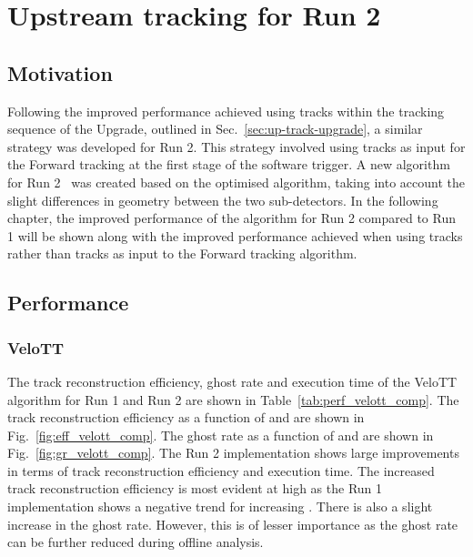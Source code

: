\section{Upstream tracking for \lhcb Run 2}
\label{sec:up-track-run2}

\subsection{Motivation}

Following the improved performance achieved using \velout tracks within the tracking sequence of the \lhcb Upgrade, outlined in Sec.~\ref{sec:up-track-upgrade}, a similar strategy was developed for \lhcb Run 2. This strategy involved using \velott tracks as input for the Forward tracking at the first stage of the software trigger. A new \velott algorithm for Run 2~\cite{velott} was created based on the optimised \velout algorithm, taking into account the slight differences in geometry between the two sub-detectors. In the following chapter, the improved performance of the \velott algorithm for Run 2 compared to Run 1 will be shown along with the improved performance achieved when using \velott tracks rather than \velo tracks as input to the Forward tracking algorithm.

\subsection{Performance}

\subsubsection{VeloTT}

The track reconstruction efficiency, ghost rate and execution time of the VeloTT algorithm for Run 1 and Run 2 are shown in Table~\ref{tab:perf_velott_comp}. The track reconstruction efficiency as a function of \ptot and \pt are shown in Fig.~\ref{fig:eff_velott_comp}. The ghost rate as a function of \ptot and \pt are shown in Fig.~\ref{fig:gr_velott_comp}. The Run 2 implementation shows large improvements in terms of track reconstruction efficiency and execution time. The increased track reconstruction efficiency is most evident at high \ptot as the Run 1 implementation shows a negative trend for increasing \ptot. There is also a slight increase in the ghost rate. However, this is of lesser importance as the ghost rate can be further reduced during offline analysis. 

